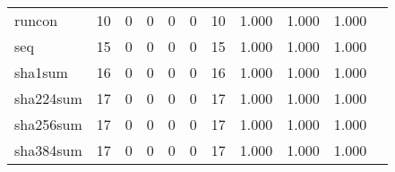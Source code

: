 \begin{longtable}{lp{1.2cm}p{1.2cm}p{1.2cm}p{1.2cm}p{1.2cm}p{1.2cm}p{1.2cm}p{1.2cm}p{1.2cm}p{1.2cm}}
runcon    &                                    10 &                                                  0 &                                                  0 &                                                  0 &                                                  0 &                                                 10 &                                         1.000 &                                              1.000 &                                              1.000 \\
seq       &                                    15 &                                                  0 &                                                  0 &                                                  0 &                                                  0 &                                                 15 &                                         1.000 &                                              1.000 &                                              1.000 \\
sha1sum   &                                    16 &                                                  0 &                                                  0 &                                                  0 &                                                  0 &                                                 16 &                                         1.000 &                                              1.000 &                                              1.000 \\
sha224sum &                                    17 &                                                  0 &                                                  0 &                                                  0 &                                                  0 &                                                 17 &                                         1.000 &                                              1.000 &                                              1.000 \\
sha256sum &                                    17 &                                                  0 &                                                  0 &                                                  0 &                                                  0 &                                                 17 &                                         1.000 &                                              1.000 &                                              1.000 \\
sha384sum &                                    17 &                                                  0 &                                                  0 &                                                  0 &                                                  0 &                                                 17 &                                         1.000 &                                              1.000 &                                              1.000 \\

\end{longtable}

